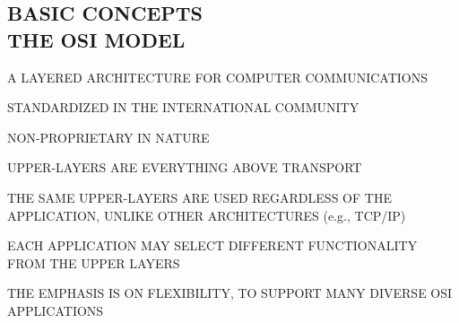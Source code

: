 





\begin{bwslide}
\part	{BASIC CONCEPTS\\THE OSI MODEL}\bf

\begin{nrtc}
\item   A LAYERED ARCHITECTURE FOR COMPUTER COMMUNICATIONS

\item   STANDARDIZED IN THE INTERNATIONAL COMMUNITY

\item   NON-PROPRIETARY IN NATURE
\end{nrtc}
\end{bwslide}


\begin{bwslide}

\begin{nrtc}
\item	UPPER-LAYERS ARE EVERYTHING ABOVE TRANSPORT
\item	THE SAME UPPER-LAYERS ARE USED REGARDLESS OF THE APPLICATION,
	UNLIKE OTHER ARCHITECTURES (e.g., TCP/IP)
\item	EACH APPLICATION MAY SELECT DIFFERENT FUNCTIONALITY FROM THE UPPER LAYERS
\item	THE EMPHASIS IS ON FLEXIBILITY, TO SUPPORT MANY DIVERSE OSI APPLICATIONS
\end{nrtc}
\end{bwslide}




%


